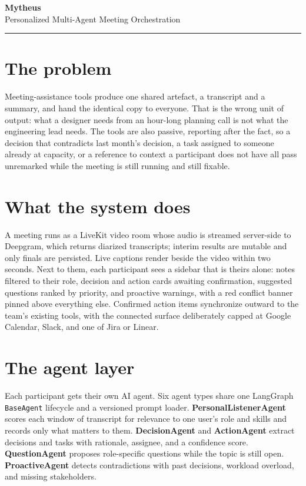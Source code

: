 \documentclass[10pt,a4paper]{article}
\begin{document}
\begin{center}
  {\LARGE\bfseries Mytheus}\\[0.35em]
  {\large Personalized Multi-Agent Meeting Orchestration}
\end{center}

\vspace{0.4em}
\hrule
\vspace{0.5em}

\section{The problem}

Meeting-assistance tools produce one shared artefact, a transcript and a
summary, and hand the identical copy to everyone. That is the wrong unit of
output: what a designer needs from an hour-long planning call is not what the
engineering lead needs. The tools are also passive, reporting after the fact,
so a decision that contradicts last month's decision, a task assigned to
someone already at capacity, or a reference to context a participant does not
have all pass unremarked while the meeting is still running and still fixable.

\section{What the system does}

A meeting runs as a LiveKit video room whose audio is streamed server-side to
Deepgram, which returns diarized transcripts; interim results are mutable and
only finals are persisted. Live captions render beside the video within two
seconds. Next to them, each participant sees a sidebar that is theirs alone:
notes filtered to their role, decision and action cards awaiting confirmation,
suggested questions ranked by priority, and proactive warnings, with a
red conflict banner pinned above everything else. Confirmed action items
synchronize outward to the team's existing tools, with the connected surface
deliberately capped at Google Calendar, Slack, and one of Jira or Linear.

\section{The agent layer}

Each participant gets their own AI agent. Six agent types share one LangGraph
\texttt{BaseAgent} lifecycle and a versioned prompt loader.
\textbf{PersonalListenerAgent} scores each window of transcript for relevance
to one user's role and skills and records only what matters to them.
\textbf{DecisionAgent} and \textbf{ActionAgent} extract decisions and tasks with
rationale, assignee, and a confidence score. \textbf{QuestionAgent} proposes
role-specific questions while the topic is still open.
\textbf{ProactiveAgent} detects contradictions with past decisions, workload
overload, and missing stakeholders.
\end{document}
